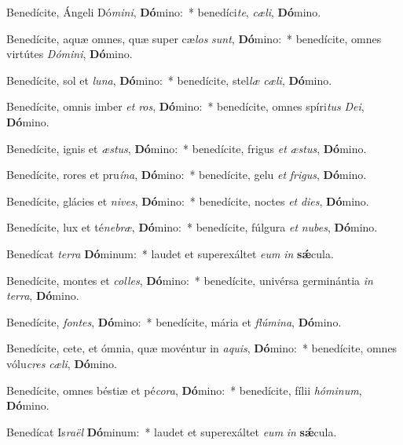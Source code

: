 \item Benedícite, Ángeli Dó\textit{mi}\textit{ni}, \textbf{Dó}mino:~* benedíci\textit{te}, \textit{cæ}\textit{li}, \textbf{Dó}mino.
\item Benedícite, aquæ omnes, quæ super cæ\textit{los} \textit{sunt}, \textbf{Dó}mino:~* benedícite, omnes virtútes \textit{Dó}\textit{mi}\textit{ni}, \textbf{Dó}mino.
\item Benedícite, sol et \textit{lu}\textit{na}, \textbf{Dó}mino:~* benedícite, stel\textit{læ} \textit{cæ}\textit{li}, \textbf{Dó}mino.
\item Benedícite, omnis imber \textit{et} \textit{ros}, \textbf{Dó}mino:~* benedícite, omnes spíri\textit{tus} \textit{De}\textit{i}, \textbf{Dó}mino.
\item Benedícite, ignis et \textit{æs}\textit{tus}, \textbf{Dó}mino:~* benedícite, frigus \textit{et} \textit{æs}\textit{tus}, \textbf{Dó}mino.
\item Benedícite, rores et pru\textit{í}\textit{na}, \textbf{Dó}mino:~* benedícite, gelu \textit{et} \textit{fri}\textit{gus}, \textbf{Dó}mino.
\item Benedícite, glácies et \textit{ni}\textit{ves}, \textbf{Dó}mino:~* benedícite, noctes \textit{et} \textit{di}\textit{es}, \textbf{Dó}mino.
\item Benedícite, lux et té\textit{ne}\textit{bræ}, \textbf{Dó}mino:~* benedícite, fúlgura \textit{et} \textit{nu}\textit{bes}, \textbf{Dó}mino.
\item Benedícat \textit{ter}\textit{ra} \textbf{Dó}minum:~* laudet et superexáltet \textit{e}\textit{um} \textit{in} \textbf{sǽ}cula.
\item Benedícite, montes et \textit{col}\textit{les}, \textbf{Dó}mino:~* benedícite, univérsa germinántia \textit{in} \textit{ter}\textit{ra}, \textbf{Dó}mino.
\item Benedícite, \textit{fon}\textit{tes}, \textbf{Dó}mino:~* benedícite, mária et \textit{flú}\textit{mi}\textit{na}, \textbf{Dó}mino.
\item Benedícite, cete, et ómnia, quæ movéntur in \textit{a}\textit{quis}, \textbf{Dó}mino:~* benedícite, omnes vólu\textit{cres} \textit{cæ}\textit{li}, \textbf{Dó}mino.
\item Benedícite, omnes béstiæ et pé\textit{co}\textit{ra}, \textbf{Dó}mino:~* benedícite, fílii \textit{hó}\textit{mi}\textit{num}, \textbf{Dó}mino.
\item Benedícat Is\textit{ra}\textit{ël} \textbf{Dó}minum:~* laudet et superexáltet \textit{e}\textit{um} \textit{in} \textbf{sǽ}cula.
